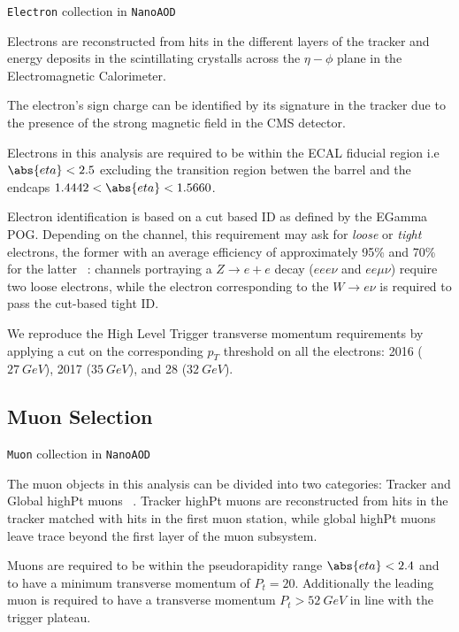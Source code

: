 \verb|Electron| collection in \verb|NanoAOD|

Electrons are reconstructed from hits in the different
layers of the tracker and energy deposits in the scintillating crystalls
across the $\eta-\phi$ plane in the Electromagnetic Calorimeter.

The electron's sign charge can be identified by its signature in the tracker
due to the presence of the strong magnetic field in the CMS detector.

Electrons in this analysis are required to be within the ECAL fiducial
region i.e $\abs{eta}<2.5$ excluding the transition region betwen the
barrel and the endcaps $1.4442<\abs{eta}<1.5660$.

Electron identification is based on a cut based ID as defined by the
EGamma POG. Depending on the channel, this requirement
may ask for \emph{loose} or \emph{tight} electrons, the former with an
average efficiency of approximately 95\% and 70\% for
the latter ~\cite{EGammaPOG_el}: channels portraying a $Z\rightarrow e+e$
decay ($eee\nu$ and $ee\mu\nu$) require two loose electrons, while the
electron corresponding to the $W\rightarrow e\nu$ is required to pass
the cut-based tight ID.

We reproduce the High Level Trigger transverse momentum requirements by
applying a cut on the corresponding $p_T$ threshold on all the electrons:
2016 ($27~GeV$), 2017 ($35~GeV$), and 28 ($32~GeV$).

\subsection{Muon Selection}

\verb|Muon| collection in \verb|NanoAOD|

The muon objects in this analysis can be divided into two categories:
Tracker and Global highPt muons ~\cite{MuonPOG}. Tracker highPt muons are
reconstructed from hits in the tracker matched with hits in the first
muon station, while global highPt muons leave trace beyond the first
layer of the muon subsystem.

Muons are required to be within the pseudorapidity range $\abs{eta}<2.4$ and
to have a minimum transverse momentum of $P_t=20$. Additionally the leading muon
is required to have a transverse momentum $P_t>52~GeV$ in line with
the trigger plateau.



